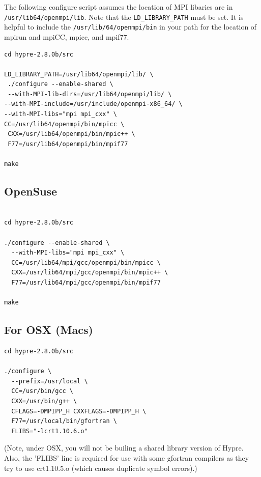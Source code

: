 \documentclass[12pt]{article}
\begin{document}
The following configure script assumes the location of MPI libaries
are in \texttt{/usr/lib64/openmpi/lib}.  Note that the
\texttt{LD\_LIBRARY\_PATH} must be set.  It is helpful to include the
\texttt{/usr/lib/64/openmpi/bin} in your path for the location of
mpirun and mpiCC, mpicc, and mpif77.


\begin{verbatim}
cd hypre-2.8.0b/src

LD_LIBRARY_PATH=/usr/lib64/openmpi/lib/ \
 ./configure --enable-shared \
 --with-MPI-lib-dirs=/usr/lib64/openmpi/lib/ \
--with-MPI-include=/usr/include/openmpi-x86_64/ \
--with-MPI-libs="mpi mpi_cxx" \
CC=/usr/lib64/openmpi/bin/mpicc \
 CXX=/usr/lib64/openmpi/bin/mpic++ \
 F77=/usr/lib64/openmpi/bin/mpif77

make

\end{verbatim}

\subsection{OpenSuse}

\begin{verbatim}

cd hypre-2.8.0b/src

./configure --enable-shared \
  --with-MPI-libs="mpi mpi_cxx" \
  CC=/usr/lib64/mpi/gcc/openmpi/bin/mpicc \
  CXX=/usr/lib64/mpi/gcc/openmpi/bin/mpic++ \
  F77=/usr/lib64/mpi/gcc/openmpi/bin/mpif77

make

\end{verbatim}

\subsection{For OSX (Macs)}

\begin{verbatim}
cd hypre-2.8.0b/src

./configure \
  --prefix=/usr/local \
  CC=/usr/bin/gcc \
  CXX=/usr/bin/g++ \
  CFLAGS=-DMPIPP_H CXXFLAGS=-DMPIPP_H \
  F77=/usr/local/bin/gfortran \
  FLIBS="-lcrt1.10.6.o"

\end{verbatim}

(Note, under OSX, you will not be builing a shared library version of
Hypre.  Also, the 'FLIBS' line is required for use with some gfortran
compilers as they try to use crt1.10.5.o (which causes duplicate
symbol errors).)
\end{document}
